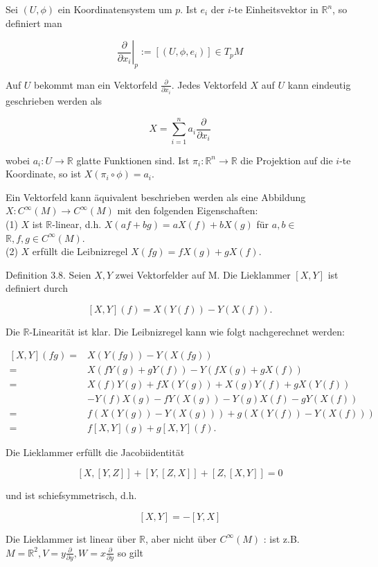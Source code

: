 \documentclass[10pt, letterpaper]{article}
\begin{document}
Sei $(U, \phi)$ ein Koordinatensystem um $p$. Ist $e_{i}$ der $i$-te Einheitsvektor in $\mathbb{R}^{n}$, so definiert man

$$
\left.\frac{\partial}{\partial x_{i}}\right|_{p}:=\left[\left(U, \phi, e_{i}\right)\right] \in T_{p} M
$$

Auf $U$ bekommt man ein Vektorfeld $\frac{\partial}{\partial x_{i}}$. Jedes Vektorfeld $X$ auf $U$ kann eindeutig geschrieben werden als

$$
X=\sum_{i=1}^{n} a_{i} \frac{\partial}{\partial x_{i}}
$$

wobei $a_{i}: U \rightarrow \mathbb{R}$ glatte Funktionen sind. Ist $\pi_{i}: \mathbb{R}^{n} \rightarrow \mathbb{R}$ die Projektion auf die $i$-te Koordinate, so ist $X\left(\pi_{i} \circ \phi\right)=a_{i}$.

Ein Vektorfeld kann äquivalent beschrieben werden als eine Abbildung $X: C^{\infty}(M) \rightarrow C^{\infty}(M)$ mit den folgenden Eigenschaften:\\
(1) $X$ ist $\mathbb{R}$-linear, d.h. $X(a f+b g)=a X(f)+b X(g)$ für $a, b \in$ $\mathbb{R}, f, g \in C^{\infty}(M)$.\\
(2) $X$ erfüllt die Leibnizregel $X(f g)=f X(g)+g X(f)$.

Definition 3.8. Seien $X, Y$ zwei Vektorfelder auf M. Die Lieklammer $[X, Y]$ ist definiert durch

$$
[X, Y](f)=X(Y(f))-Y(X(f)) .
$$

Die $\mathbb{R}$-Linearität ist klar. Die Leibnizregel kann wie folgt nachgerechnet werden:

$$
\begin{aligned}
{[X, Y](f g)=} & X(Y(f g))-Y(X(f g)) \\
= & X(f Y(g)+g Y(f))-Y(f X(g)+g X(f)) \\
= & X(f) Y(g)+f X(Y(g))+X(g) Y(f)+g X(Y(f)) \\
& -Y(f) X(g)-f Y(X(g))-Y(g) X(f)-g Y(X(f)) \\
= & f(X(Y(g))-Y(X(g)))+g(X(Y(f))-Y(X(f))) \\
= & f[X, Y](g)+g[X, Y](f) .
\end{aligned}
$$

Die Lieklammer erfüllt die Jacobiidentität

$$
[X,[Y, Z]]+[Y,[Z, X]]+[Z,[X, Y]]=0
$$

und ist schiefsymmetrisch, d.h.

$$
[X, Y]=-[Y, X]
$$

Die Lieklammer ist linear über $\mathbb{R}$, aber nicht über $C^{\infty}(M)$ : ist z.B. $M=\mathbb{R}^{2}, V=y \frac{\partial}{\partial y}, W=x \frac{\partial}{\partial y}$ so gilt
\end{document}
